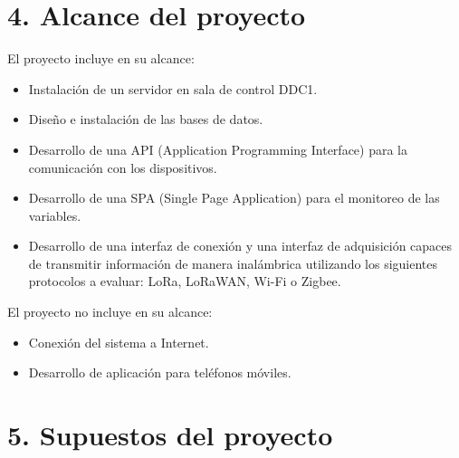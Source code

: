 \documentclass[
11pt, %
]{charter}
\begin{document}



\section{4. Alcance del proyecto}
\label{sec:alcance}


El proyecto incluye en su alcance:
\begin{itemize} 
	\item Instalación de un servidor en sala de control DDC1.
	\item Diseño e instalación de las bases de datos.
	\item Desarrollo de una API (Application Programming Interface) para la comunicación con los dispositivos.
	\item Desarrollo de una SPA (Single Page Application) para el monitoreo de las variables.
	\item Desarrollo de una interfaz de conexión y una interfaz de adquisición capaces de transmitir información de manera inalámbrica utilizando los siguientes protocolos a evaluar: LoRa, LoRaWAN, Wi-Fi o Zigbee.
	
\end{itemize}

El proyecto no incluye en su alcance:
\begin{itemize}
	\item Conexión del sistema a Internet.
	\item Desarrollo de aplicación para teléfonos móviles.
\end{itemize}




\section{5. Supuestos del proyecto}
\label{sec:supuestos}
\end{document}
